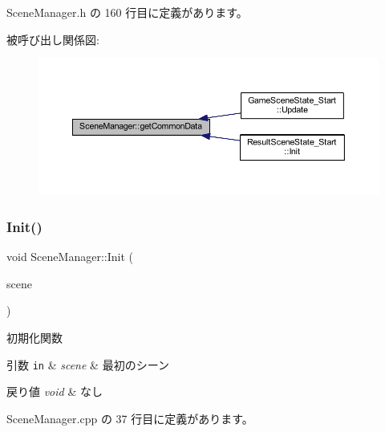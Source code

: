  Scene\+Manager.\+h の 160 行目に定義があります。

被呼び出し関係図\+:
\nopagebreak
\begin{figure}[H]
\begin{center}
\leavevmode
\includegraphics[width=350pt]{class_scene_manager_a73b2a1c2be8f5b9027af7d88d2ec6457_icgraph}
\end{center}
\end{figure}
\mbox{\label{class_scene_manager_a3d14c04a921c6c670e89fbf22a719b00}} 
\subsubsection{\texorpdfstring{Init()}{Init()}}
{\footnotesize\ttfamily void Scene\+Manager\+::\+Init (\begin{DoxyParamCaption}\item[{\mbox{\hyperlink{class_scene_base}{Scene\+Base}} $\ast$}]{scene }\end{DoxyParamCaption})}



初期化関数 


\begin{DoxyParams}[1]{引数}
\mbox{\tt in}  & {\em scene} & 最初のシーン \\
\hline
\end{DoxyParams}

\begin{DoxyRetVals}{戻り値}
{\em void} & なし \\
\hline
\end{DoxyRetVals}


 Scene\+Manager.\+cpp の 37 行目に定義があります。


